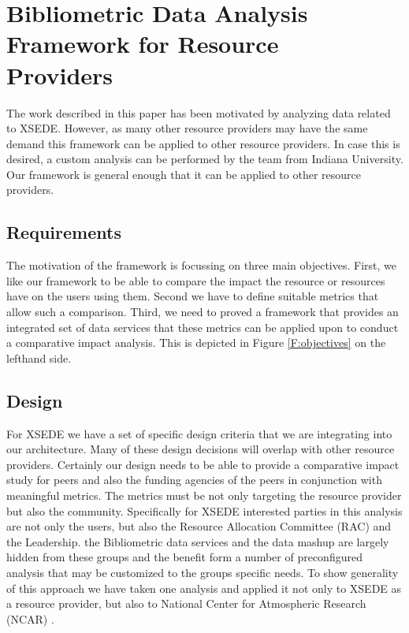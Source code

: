 \documentclass{sig-alternate}
\begin{document}
\section{Bibliometric Data Analysis \\Framework for Resource
  \\Providers}

The work described in this paper has been motivated by analyzing data
related to XSEDE. However, as many other resource providers may have
the same demand this framework can be applied to other resource
providers. In case this is desired, a custom analysis can be
performed by the team from Indiana University. Our framework is
general enough that it can be applied to other resource providers.

\subsection{Requirements}

The motivation of the framework is focussing on three main objectives.
First, we like our framework to be able to compare the impact the
resource or resources have on the users using them. Second we have to
define suitable metrics that allow such a comparison. Third, we need
to proved a framework that provides an  integrated set of data
services that these metrics can be applied upon to conduct a
comparative impact analysis. This is depicted in Figure
\ref{F:objectives} on the lefthand side. 

\subsection{Design}

For XSEDE we have a set of specific design criteria that we are
integrating into our architecture. Many of these design decisions
will overlap with other resource providers. Certainly our design needs
to be able to provide a comparative impact study for peers and also
the funding agencies of the peers in conjunction with meaningful
metrics. The metrics must be not only targeting the resource provider
but also the community. Specifically for XSEDE interested parties in
this analysis are not only the users, but also the Resource Allocation
Committee (RAC) and the Leadership. the Bibliometric data services and
the data mashup are largely hidden from these groups and the benefit
form a number of preconfigured analysis that may be customized to the
groups specific needs. To show generality of this approach we have
taken one analysis and applied it not only to XSEDE as a resource
provider, but also to National Center for Atmospheric Research
(NCAR) \cite{www-ncar}. 
\end{document}
